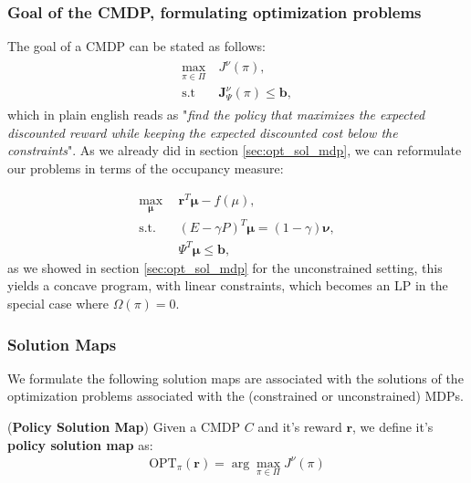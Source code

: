 \subsubsection{Goal of the CMDP, formulating optimization problems}

The goal of a CMDP can be stated as follows:
\begin{align}
    \begin{aligned}
    \max_{\pi \in \Pi} & ~ J^\nu(\pi), \\
    \text{s.t} & ~ \bm{J}_\Psi^\nu(\pi)\leq \bm{b},
    \end{aligned}
    \label{eq:pb_constrained_direct_policy_opt}
\end{align}
which in plain english reads as "\textit{find the policy that maximizes the expected discounted reward while keeping the expected discounted cost below the constraints}". As we already did in section \ref{sec:opt_sol_mdp}, we can reformulate our problems in terms of the occupancy measure:

\begin{equation}
    \begin{aligned}
        \max_{\bm{\mu}} & ~~ \bm{r}^T\bm{\bm{\mu}}-f(\mu), \\
        \text{s.t.} & ~~  (E-\gamma P)^T  \bm{\mu} = (1-\gamma) \bm{\nu}, \\
                    & ~~  \Psi^T \bm{\mu} \leq \bm{b},
    \end{aligned}
    \label{eq:pb_constrained_occupancy_opt}
\end{equation}
as we showed in section \ref{sec:opt_sol_mdp} for the unconstrained setting, this yields a concave program, with linear constraints, which becomes an LP in the special case where $\Omega(\pi) = 0$.

\subsubsection{Solution Maps}

We formulate the following solution maps are associated with the solutions of the optimization problems associated with the (constrained or unconstrained) MDPs.

\begin{definition}
    \label{def:policy_solmap}
    (\textbf{Policy Solution Map})
    Given a CMDP $\textit{C}$ and it's reward $\bm{r}$, we define it's \textbf{policy solution map} as:
    \begin{align*}
        \text{OPT}_{\pi}(\bm{r}) = \arg \max_{\pi\in \Pi}  J^\nu(\pi)
    \end{align*}
\end{definition}

